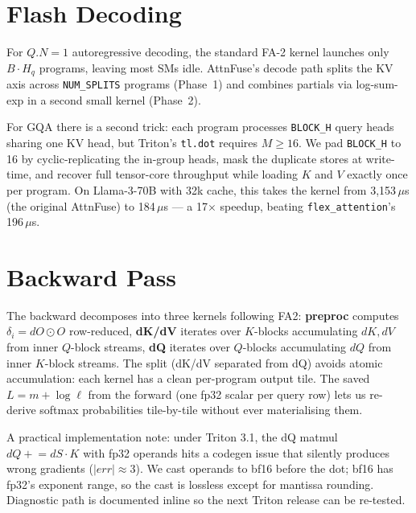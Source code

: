 \documentclass[10pt,twocolumn]{article}
\begin{document}
\section{Flash Decoding}
\label{sec:decode}

For $Q.N{=}1$ autoregressive decoding, the standard FA-2 kernel
launches only $B \cdot H_q$ programs, leaving most SMs idle.
AttnFuse's decode path splits the KV axis across
\texttt{NUM\_SPLITS} programs (Phase~1) and combines partials via
log-sum-exp in a second small kernel (Phase~2).

For GQA there is a second trick: each program processes
\texttt{BLOCK\_H} query heads sharing one KV head, but Triton's
\texttt{tl.dot} requires $M \geq 16$. We pad \texttt{BLOCK\_H} to
16 by cyclic-replicating the in-group heads, mask the duplicate
stores at write-time, and recover full tensor-core throughput while
loading $K$ and $V$ exactly once per program. On Llama-3-70B with
32k cache, this takes the kernel from 3{,}153\,$\mu$s (the original
AttnFuse) to 184\,$\mu$s --- a 17$\times$ speedup, beating
\texttt{flex\_attention}'s 196\,$\mu$s.

\section{Backward Pass}
\label{sec:backward}

The backward decomposes into three kernels following FA2:
\textbf{preproc} computes $\delta_i = dO \odot O$ row-reduced,
\textbf{dK/dV} iterates over $K$-blocks accumulating $dK, dV$ from
inner $Q$-block streams, \textbf{dQ} iterates over $Q$-blocks
accumulating $dQ$ from inner $K$-block streams. The split (dK/dV
separated from dQ) avoids atomic accumulation: each kernel has a
clean per-program output tile. The saved $L = m + \log\ell$ from
the forward (one fp32 scalar per query row) lets us re-derive
softmax probabilities tile-by-tile without ever materialising them.

A practical implementation note: under Triton 3.1, the dQ matmul
$dQ \mathrel{+}= dS \cdot K$ with fp32 operands hits a codegen
issue that silently produces wrong gradients ($|err| \approx 3$).
We cast operands to bf16 before the dot; bf16 has fp32's exponent
range, so the cast is lossless except for mantissa rounding.
Diagnostic path is documented inline so the next Triton release can
be re-tested.
\end{document}

